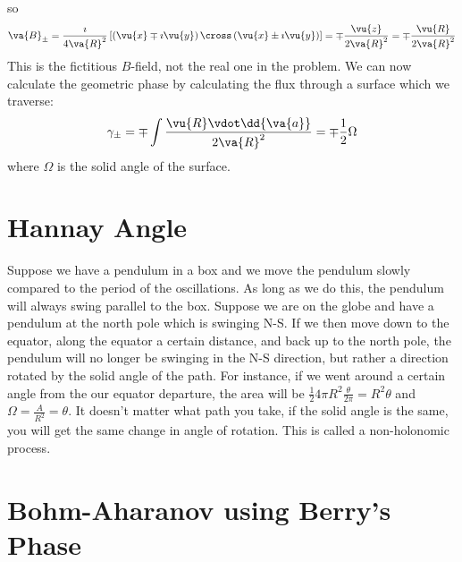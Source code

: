 \documentclass[a4paper,twoside,master.tex]{subfiles}
\begin{document}
\begin{ex}
\begin{equation}
    \end{equation}
    so
    \begin{equation}
        \va{B}_{\pm} = \frac{\imath}{4 \va{R}^2} \left[ \left( \vu{x} \mp \imath \vu{y} \right) \cross \left( \vu{x} \pm \imath \vu{y} \right) \right] = \mp \frac{\vu{z}}{2 \va{R}^2} = \mp \frac{\vu{R}}{2 \va{R}^2}
    \end{equation}
    This is the fictitious $ B $-field, not the real one in the problem. We can now calculate the geometric phase by calculating the flux through a surface which we traverse:
    \begin{equation}
        \gamma_{\pm} = \mp \int \frac{\vu{R} \vdot \dd{\va{a}}}{2 \va{R}^2} = \mp \frac{1}{2} \Omega
    \end{equation}
    where $ \Omega $ is the solid angle of the surface.
\end{ex}


\section{Hannay Angle}
\label{sec:hannay_angle}

Suppose we have a pendulum in a box and we move the pendulum slowly compared to the period of the oscillations. As long as we do this, the pendulum will always swing parallel to the box. Suppose we are on the globe and have a pendulum at the north pole which is swinging N-S. If we then move down to the equator, along the equator a certain distance, and back up to the north pole, the pendulum will no longer be swinging in the N-S direction, but rather a direction rotated by the solid angle of the path. For instance, if we went around a certain angle from the our equator departure, the area will be $ \frac{1}{2} 4 \pi R^2 \frac{\theta}{2 \pi} = R^2 \theta $ and $ \Omega = \frac{A}{R^2} = \theta $. It doesn't matter what path you take, if the solid angle is the same, you will get the same change in angle of rotation. This is called a non-holonomic process.


\section{Bohm-Aharanov using Berry's Phase}
\label{sec:bohm-aharanov_using_berrys_phase}
\end{document}
